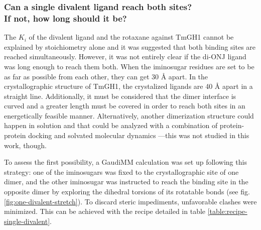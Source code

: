\subsubsection[Can a single divalent ligand reach both sites? If not, how long should it be?]{Can a single divalent ligand reach both sites? \\ If not, how long should it be?}
\label{section:di-ONJ-stretch}

The $K_{i}$ of the divalent ligand and the rotaxane against TmGH1 cannot be explained by stoichiometry alone and it was suggested that both binding sites are reached simultaneously. However, it was not entirely clear if the di-ONJ ligand was long enough to reach them both. When the iminosugar residues are set to be as far as possible from each other, they can get 30 Å apart. In the crystallographic structure of TmGH1,\cite{pdb:2wbg} the crystalized ligands are 40 Å apart in a straight line. Additionally, it must be considered that the dimer interface is curved and a greater length must be covered in order to reach both sites in an energetically feasible manner. Alternatively, another dimerization structure could happen in solution and that could be analyzed with a combination of protein-protein docking and solvated molecular dynamics ---this was not studied in this work, though.

To assess the first possibility, a GaudiMM calculation was set up following this strategy: one of the iminosugars was fixed to the crystallographic site of one dimer, and the other iminosugar was instructed to reach the binding site in the opposite dimer by exploring the dihedral torsions of its rotatable bonds (see fig. \ref{fig:one-divalent-stretch}). To discard steric impediments, unfavorable clashes were minimized. This can be achieved with the recipe detailed in table \ref{table:recipe-single-divalent}.


